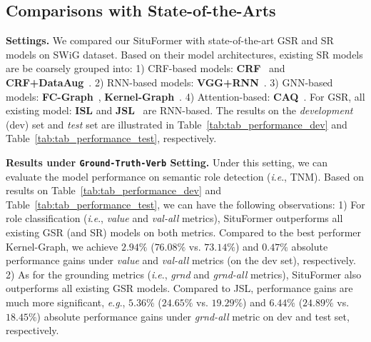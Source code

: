 \documentclass[letterpaper]{article} %
\newcommand{\ie}{\textit{i}.\textit{e}.}
\newcommand{\eg}{\textit{e}.\textit{g}.}
\begin{document}
\subsection{Comparisons with State-of-the-Arts}
\noindent\textbf{Settings.} We compared our SituFormer with state-of-the-art GSR and SR models on SWiG dataset. Based on their model architectures, existing SR models are be coarsely grouped into: 1) CRF-based models: \textbf{CRF}~\cite{yatskar2016situation} and \textbf{CRF+DataAug}~\cite{yatskar2017commonly}. 2) RNN-based models: \textbf{VGG+RNN}~\cite{mallya2017recurrent}. 3) GNN-based models: \textbf{FC-Graph}~\cite{li2017situation}, \textbf{Kernel-Graph}~\cite{suhail2019mixture}. 4) Attention-based: \textbf{CAQ}~\cite{9156513}. For GSR, all existing model: \textbf{ISL} and \textbf{JSL}~\cite{pratt2020grounded} are RNN-based. The results on the \textit{development} (dev) set and \emph{test} set are illustrated in Table~\ref{tab:tab_performance_dev} and Table~\ref{tab:tab_performance_test}, respectively. 


\noindent\textbf{Results under \texttt{Ground-Truth-Verb} Setting.} Under this setting, we can evaluate the model performance on semantic role detection (\ie, TNM). Based on results on Table~\ref{tab:tab_performance_dev} and Table~\ref{tab:tab_performance_test}, we can have the following observations: 1) For role classification (\ie, \emph{value} and \emph{val-all} metrics), SituFormer outperforms all existing GSR (and SR) models on both metrics. Compared to the best performer Kernel-Graph, we achieve $2.94\%$ ($76.08\%$ vs. $73.14\%$) and $0.47\%$ absolute performance gains under \emph{value} and \emph{val-all} metrics (on the dev set), respectively. 2) As for the grounding metrics (\ie, \emph{grnd} and \emph{grnd-all} metrics), SituFormer also outperforms all existing GSR models. Compared to JSL, performance gains are much more significant, \eg, $5.36\%$ ($24.65\%$ vs. $19.29\%$) and $6.44\%$ ($24.89\%$ vs. $18.45\%$) absolute performance gains under \emph{grnd-all} metric on dev and test set, respectively. 
\end{document}
